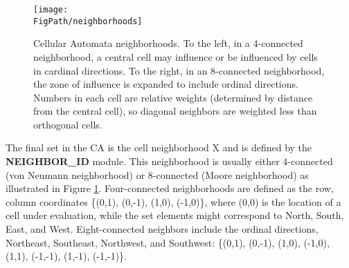 	\begin{figure}[!h]
		\centering
		\texttt{[image: \\FigPath/neighborhoods]}
		\caption[Cellular Automata neighborhoods]{Cellular Automata neighborhoods. To the left, in a 4-connected neighborhood, a central cell may influence or be influenced by cells in cardinal directions. To the right, in an 8-connected neighborhood, the zone of influence is expanded to include ordinal directions. Numbers in each cell are relative weights (determined by distance from the central cell), so diagonal neighbors are weighted less than orthogonal cells.}
		\label{fig_MrRogers}
	\end{figure}
	
		The final set in the CA is the cell neighborhood X and is defined by the \textbf{NEIGHBOR\_ID} module. This neighborhood is usually either 4-connected (von Neumann neighborhood) or 8-connected (Moore neighborhood) as illustrated in Figure \ref{fig_MrRogers}. Four-connected neighborhoods are defined as the row, column coordinates \{(0,1), (0,-1), (1,0), (-1,0)\}, where (0,0) is the location of a cell under evaluation, while the set elements might correspond to North, South, East, and West. Eight-connected neighbors include the ordinal directions, Northeast, Southeast, Northwest, and Southwest: \{(0,1), (0,-1), (1,0), (-1,0), (1,1), (-1,-1), (1,-1), (-1,-1)\}.
		
